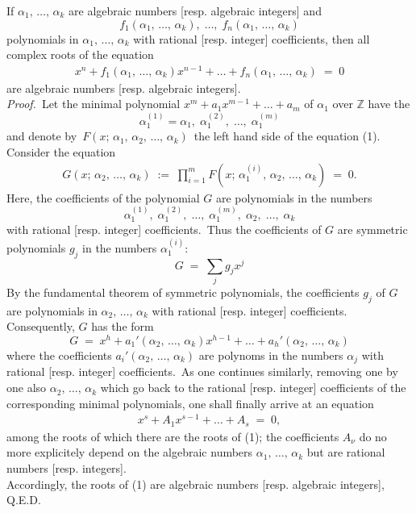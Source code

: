 \documentclass[12pt]{article}
\theoremstyle{definition}
\begin{document}
If $\alpha_1,\,\ldots,\,\alpha_k$ are algebraic numbers [resp. algebraic integers] and 
$$f_1(\alpha_1,\,\ldots,\,\alpha_k),\;\ldots,\;f_n(\alpha_1,\,\ldots,\,\alpha_k)$$ 
polynomials in $\alpha_1,\,\ldots,\,\alpha_k$ with rational [resp. integer] coefficients, then all complex roots of the equation
\begin{align}
x^n+f_1(\alpha_1,\,\ldots,\,\alpha_k)x^{n-1}+\ldots+f_n(\alpha_1,\,\ldots,\,\alpha_k) \;=\; 0
\end{align}
are algebraic numbers [resp. algebraic integers].\\


\emph{Proof.}\, Let the minimal polynomial $x^m+a_1x^{m-1}+\ldots+a_m$ of $\alpha_1$ over $\mathbb{Z}$ have the 
$$\alpha_1^{(1)} = \alpha_1,\; \alpha_1^{(2)},\; \ldots,\; \alpha_1^{(m)}$$
and denote by\, $F(x;\,\alpha_1,\,\alpha_2,\,\ldots,\,\alpha_k)$\, the left hand side of the equation (1).\, Consider the equation
\begin{align}
G(x;\,\alpha_2,\,\ldots,\,\alpha_k) 
\;:=\; \prod_{i=1}^m F(x;\,\alpha_1^{(i)},\,\alpha_2,\,\ldots,\,\alpha_k) \;=\; 0.
\end{align}
Here, the coefficients of the polynomial $G$ are polynomials in the numbers
$$\alpha_1^{(1)},\; \alpha_1^{(2)},\; \ldots,\; \alpha_1^{(m)},\; \alpha_2,\; \ldots,\; \alpha_k$$
with rational [resp. integer] coefficients.\, Thus the coefficients of $G$ are symmetric polynomials $g_j$ in the numbers $\alpha_1^{(i)}$:
$$G \;=\; \sum_jg_jx^j$$
By the fundamental theorem of symmetric polynomials, the coefficients $g_j$ of $G$ are polynomials in 
$\alpha_2,\,\ldots,\,\alpha_k$ with rational [resp. integer] coefficients.\, Consequently, $G$ has the form
$$G \;=\; x^h+a_1'(\alpha_2,\,\ldots,\,\alpha_k)x^{h-1}+\ldots+a_h'(\alpha_2,\,\ldots,\,\alpha_k)$$
where the coefficients $a_i'(\alpha_2,\,\ldots,\,\alpha_k)$ are polynoms in the numbers $\alpha_j$ with rational [resp. integer] coefficients.\, As one continues similarly, removing one by one also $\alpha_2,\,\ldots,\,\alpha_k$ which go back to the rational [resp. integer] coefficients of the corresponding minimal polynomials, one shall finally arrive at an equation
\begin{align}
x^s+A_1x^{s-1}+\ldots+A_s \;=\; 0,
\end{align}
among the roots of which there are the roots of (1); the coefficients $A_\nu$ do no more explicitely depend on the algebraic numbers $\alpha_1,\,\ldots,\,\alpha_k$ but are rational numbers [resp. integers].\\
Accordingly, the roots of (1) are algebraic numbers [resp. algebraic integers], Q.E.D.

\end{document}
